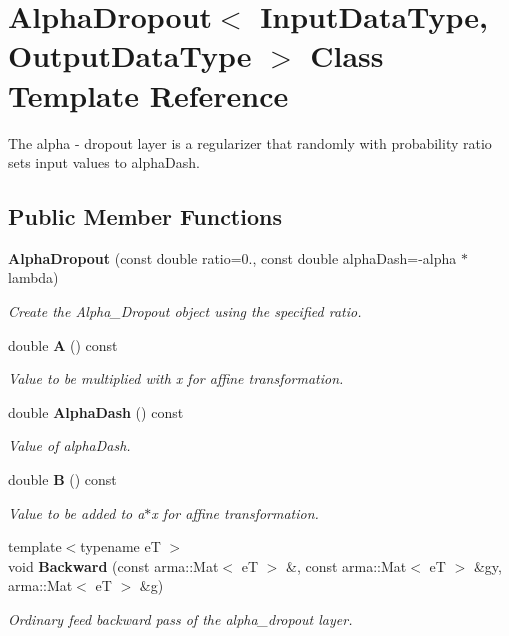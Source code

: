 \section{Alpha\+Dropout$<$ Input\+Data\+Type, Output\+Data\+Type $>$ Class Template Reference}
\label{classmlpack_1_1ann_1_1AlphaDropout}


The alpha -\/ dropout layer is a regularizer that randomly with probability \textquotesingle{}ratio\textquotesingle{} sets input values to alpha\+Dash.  


\subsection*{Public Member Functions}
\begin{DoxyCompactItemize}
\item 
\textbf{ Alpha\+Dropout} (const double ratio=0., const double alpha\+Dash=-\/alpha $\ast$lambda)
\begin{DoxyCompactList}\small\item\em Create the Alpha\+\_\+\+Dropout object using the specified ratio. \end{DoxyCompactList}\item 
double \textbf{ A} () const
\begin{DoxyCompactList}\small\item\em Value to be multiplied with x for affine transformation. \end{DoxyCompactList}\item 
double \textbf{ Alpha\+Dash} () const
\begin{DoxyCompactList}\small\item\em Value of alpha\+Dash. \end{DoxyCompactList}\item 
double \textbf{ B} () const
\begin{DoxyCompactList}\small\item\em Value to be added to a$\ast$x for affine transformation. \end{DoxyCompactList}\item 
{\footnotesize template$<$typename eT $>$ }\\void \textbf{ Backward} (const arma\+::\+Mat$<$ eT $>$ \&, const arma\+::\+Mat$<$ eT $>$ \&gy, arma\+::\+Mat$<$ eT $>$ \&g)
\begin{DoxyCompactList}\small\item\em Ordinary feed backward pass of the alpha\+\_\+dropout layer. \end{DoxyCompactList}\item 

\end{DoxyCompactItemize}
